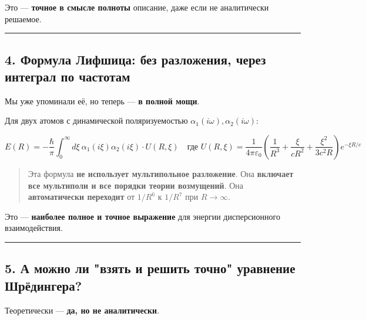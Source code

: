 \documentclass[11pt]{article}
\begin{document}
Это --- \textbf{точное в смысле полноты} описание, даже если не
аналитически решаемое.

\begin{center}\rule{0.5\linewidth}{\linethickness}\end{center}

\subsection{4. Формула Лифшица: без разложения, через интеграл по
частотам}\label{ux444ux43eux440ux43cux443ux43bux430-ux43bux438ux444ux448ux438ux446ux430-ux431ux435ux437-ux440ux430ux437ux43bux43eux436ux435ux43dux438ux44f-ux447ux435ux440ux435ux437-ux438ux43dux442ux435ux433ux440ux430ux43b-ux43fux43e-ux447ux430ux441ux442ux43eux442ux430ux43c}

Мы уже упоминали её, но теперь --- \textbf{в полной мощи}.

Для двух атомов с динамической поляризуемостью
\(\alpha_1(i\omega), \alpha_2(i\omega)\):

\[
\boxed{
E(R) = -\frac{\hbar}{\pi} \int_0^\infty d\xi\ \alpha_1(i\xi) \alpha_2(i\xi) \cdot U(R, \xi)
}
\quad \text{где } U(R, \xi) = \frac{1}{4\pi\varepsilon_0} \left( \frac{1}{R^3} + \frac{\xi}{c R^2} + \frac{\xi^2}{3c^2 R} \right) e^{-\xi R / c}
\]

\begin{quote}
Эта формула \textbf{не использует мультипольное разложение}. Она
\textbf{включает все мультиполи и все порядки теории возмущений}. Она
\textbf{автоматически переходит} от \(1/R^6\) к \(1/R^7\) при
\(R \to \infty\).
\end{quote}

Это --- \textbf{наиболее полное и точное выражение} для энергии
дисперсионного взаимодействия.

\begin{center}\rule{0.5\linewidth}{\linethickness}\end{center}

\subsection{5. А можно ли "взять и решить точно" уравнение
Шрёдингера?}\label{ux430-ux43cux43eux436ux43dux43e-ux43bux438-ux432ux437ux44fux442ux44c-ux438-ux440ux435ux448ux438ux442ux44c-ux442ux43eux447ux43dux43e-ux443ux440ux430ux432ux43dux435ux43dux438ux435-ux448ux440ux451ux434ux438ux43dux433ux435ux440ux430}

Теоретически --- \textbf{да, но не аналитически}.
\end{document}
